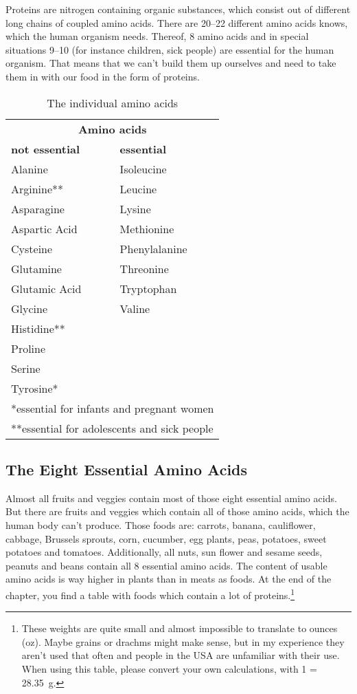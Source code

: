 \documentclass[../main.tex]{subfiles}
\begin{document}
  Proteins are nitrogen containing organic substances, which consist out of different long chains of coupled amino acids.
  There are 20--22 different amino acids knows, which the human organism needs.
  Thereof, 8 amino acids and in special situations 9--10 (for instance children, sick people) are essential for the human organism.
  That means that we can't build them up ourselves and need to take them in with our food in the form of proteins.

  \begin{table}[htb!]
    \centering
    \begin{tabular}{l|l}
      \multicolumn{2}{c}{\textbf{Amino acids}} \\
      \textbf{not essential} & \textbf{essential} \\
      \hline
      Alanine & Isoleucine \\
      Arginine** & Leucine \\
      Asparagine & Lysine \\
      Aspartic Acid & Methionine \\
      Cysteine & Phenylalanine \\
      Glutamine & Threonine \\
      Glutamic Acid & Tryptophan \\
      Glycine & Valine \\
      Histidine**\\
      Proline\\
      Serine\\
      Tyrosine*\\
      \hline
      \multicolumn{2}{l}{\footnotesize{*essential for infants and pregnant women}}\\
      \multicolumn{2}{l}{\footnotesize{**essential for adolescents and sick people}}
    \end{tabular}
    \caption{The individual amino acids}
  \end{table}

  \subsection{The Eight Essential Amino Acids}

  Almost all fruits and veggies contain most of those eight essential amino acids.
  But there are fruits and veggies which contain all of those amino acids, which the human body can't produce.
  Those foods are: carrots, banana, cauliflower, cabbage, Brussels sprouts, corn, cucumber, egg plants, peas, potatoes, sweet potatoes and tomatoes.
  Additionally, all nuts, sun flower and sesame seeds, peanuts and beans contain all 8 essential amino acids.
  The content of usable amino acids is way higher in plants than in meats as foods.
  At the end of the chapter, you find a table with foods which contain a lot of proteins.\footnote{These weights are
    quite small and almost impossible to translate to ounces (oz). Maybe grains or drachms might make sense, but in my experience they aren't used that often
    and people in the USA are unfamiliar with their use. When using this table, please convert your own calculations, with \SI{1}{\oz} = \SI{28.35}{\g}.}
  
\end{document}
